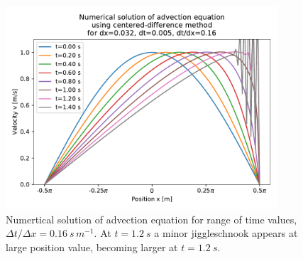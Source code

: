 \begin{figure}[H]
  \centering
  \includegraphics[width=0.9\textwidth]{figures/numerical/centred_nx_100_nt_281_2d.pdf}
  \vspace*{-5mm}
  \caption{Numertical solution of advection equation for range of time values, $\Delta t / \Delta x = 0.16 \ s \, m^{-1}$. At $t = 1.2 \ s$ a minor jiggleschnook appears at large position value, becoming larger at $t = 1.2 \ s$.}
  \label{fig_centred_nx_100_nt_281_2d}
  \vspace*{-10mm}
\end{figure}

